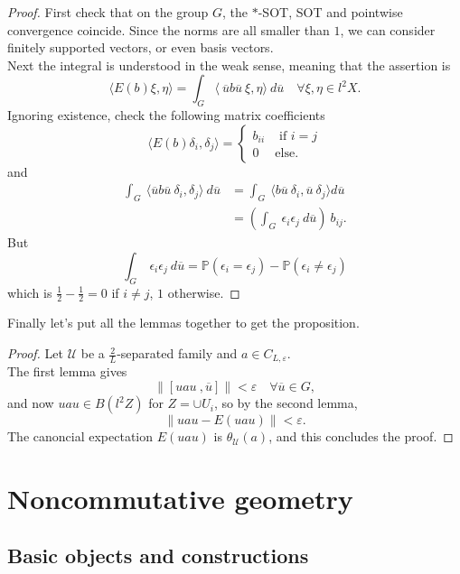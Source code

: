 \begin{proof}
First check that on the group $G$, the $*$-SOT, SOT and pointwise convergence coincide. Since the norms are all smaller than $1$, we can consider finitely supported vectors, or even basis vectors. \\

Next the integral is understood in the weak sense, meaning that the assertion is 
\[\langle E(b) \xi, \eta \rangle = \int_G \langle \ \overline u b \overline u \ \xi , \eta \rangle \ d\overline u \quad \forall \xi, \eta \in l^2 X.\]
 Ignoring existence, check the following matrix coefficients
\[ \langle E(b)\delta_i, \delta_j \rangle = \left\{\begin{array}{lr} b_{ii} & \text{ if }i =j \\ 0 & \text{else.}\end{array}\right. \]
and 
\[\begin{split}
\int_G \ \langle \overline u b \overline u  \ \delta_i , \delta_j   \rangle  \ d \overline u & = \int_G \ \langle b \overline u \ \delta_i , \overline u \ \delta_j \rangle d\overline u \\ 
				& = (\int_G \ \epsilon_i \epsilon_j \ d\overline u ) \ b_{ij} .
\end{split}\] 
But \[ \int_G \ \epsilon_i \epsilon_j \ d\overline u = \mathbb P (\epsilon_i = \epsilon_j ) - \mathbb P (\epsilon_i \neq \epsilon_j)\]
which is $\frac{1}{2} - \frac{1}{2}=0$ if $i\neq j$, $1$ otherwise.
\end{proof}

Finally let's put all the lemmas together to get the proposition.

\begin{proof} Let $\mathcal U $ be a $\frac{2}{L}$-separated family and $a\in C_{L,\varepsilon}$. \\
The first lemma gives 
\[ \| [ uau \ , \overline u ] \| < \varepsilon \quad \forall \overline u \in G,\]
and now $uau \in B(l^2 Z)$ for $Z = \cup U_i$, so by the second lemma,
\[ \| uau - E(uau) \| < \varepsilon.\]
The canoncial expectation $E(uau)$ is $\theta_{\mathcal U}(a)$, and this concludes the proof.
\end{proof}
\newpage
\section{Noncommutative geometry}

\subsection{Basic objects and constructions}

